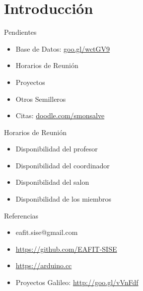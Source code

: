 \section{Introducción}


\begin{frame}{Pendientes}

	\begin{itemize}
		\item Base de Datos: \url{goo.gl/wctGV9}
		\item Horarios de Reunión
		\item Proyectos 
		\item Otros Semilleros
		\item Citas: \url{doodle.com/smonsalve}
	\end{itemize}
  
\end{frame}


\begin{frame}{Horarios de Reunión}
	\begin{itemize}
		\item Disponibilidad del profesor
		\item Disponibilidad del coordinador
		\item Disponibilidad del salon
		\item Disponibilidad de los miembros
	\end{itemize}
\end{frame}


\begin{frame}{Referencias}

\begin{itemize}
	\item 	eafit.sise@gmail.com
	\item	\url{https://github.com/EAFIT-SISE}
	\item   \url{https://arduino.cc}
	\item  Proyectos Galileo: \url{http://goo.gl/vVnFdf}

\end{itemize}
\end{frame}